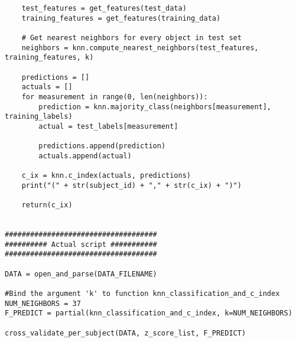 \documentclass[a4paper]{article}
\begin{document}
\begin{lstlisting}
    test_features = get_features(test_data)
    training_features = get_features(training_data)

    # Get nearest neighbors for every object in test set
    neighbors = knn.compute_nearest_neighbors(test_features, training_features, k)

    predictions = []
    actuals = []
    for measurement in range(0, len(neighbors)):
        prediction = knn.majority_class(neighbors[measurement], training_labels)
        actual = test_labels[measurement]

        predictions.append(prediction)
        actuals.append(actual)

    c_ix = knn.c_index(actuals, predictions)
    print("(" + str(subject_id) + "," + str(c_ix) + ")")

    return(c_ix)


####################################
########## Actual script ###########
####################################

DATA = open_and_parse(DATA_FILENAME)

#Bind the argument 'k' to function knn_classification_and_c_index
NUM_NEIGHBORS = 37
F_PREDICT = partial(knn_classification_and_c_index, k=NUM_NEIGHBORS)

cross_validate_per_subject(DATA, z_score_list, F_PREDICT)

\end{lstlisting}
\end{document}

